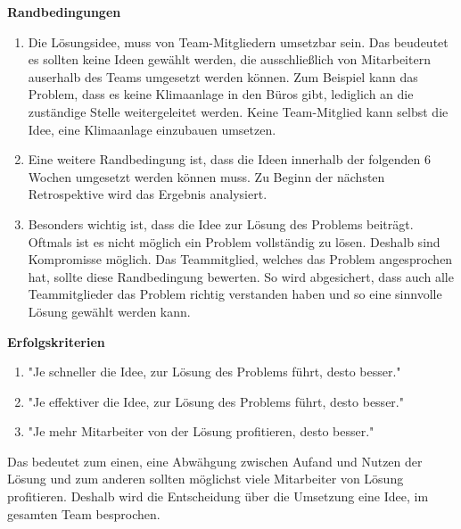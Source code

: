 \textbf{Randbedingungen}
\begin{enumerate}
    \item Die Lösungsidee, muss von Team-Mitgliedern umsetzbar sein. Das beudeutet es sollten keine Ideen gewählt werden, die ausschließlich von Mitarbeitern auserhalb des Teams
    umgesetzt werden können. Zum Beispiel kann das Problem, dass es keine Klimaanlage in den Büros gibt, lediglich an die zuständige Stelle weitergeleitet werden.
    Keine Team-Mitglied kann selbst die Idee, eine Klimaanlage einzubauen umsetzen. 
    \item Eine weitere Randbedingung ist, dass die Ideen innerhalb der folgenden 6 Wochen umgesetzt werden können muss. Zu Beginn der 
    nächsten Retrospektive wird das Ergebnis analysiert.
    \item Besonders wichtig ist, dass die Idee zur Lösung des Problems beiträgt. Oftmals ist es nicht möglich ein Problem vollständig zu lösen. 
    Deshalb sind Kompromisse möglich. Das Teammitglied, welches das Problem angesprochen hat, sollte diese Randbedingung bewerten. So 
    wird abgesichert, dass auch alle Teammitglieder das Problem richtig verstanden haben und so eine sinnvolle Lösung gewählt werden kann. 
\end{enumerate}

\textbf{Erfolgskriterien}
\begin{enumerate}
    \item "Je schneller die Idee, zur Lösung des Problems führt, desto besser." 
    \item "Je effektiver die Idee, zur Lösung des Problems führt, desto besser."
    \item "Je mehr Mitarbeiter von der Lösung profitieren, desto besser."
\end{enumerate}

Das bedeutet zum einen, eine Abwähgung zwischen Aufand und Nutzen der Lösung und zum anderen sollten möglichst viele Mitarbeiter 
von Lösung profitieren. Deshalb wird die Entscheidung über die Umsetzung eine Idee, im gesamten Team besprochen. 